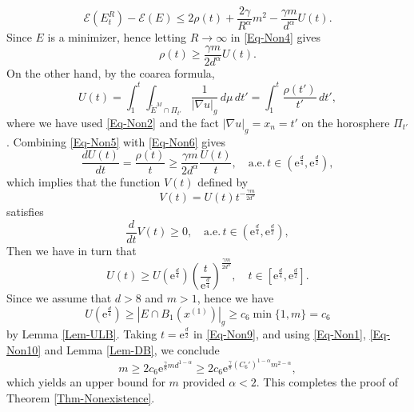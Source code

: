 \documentclass[11pt,reqno]{amsart}
\theoremstyle{definition}
\theoremstyle{remark}
\numberwithin{equation}{section}
\renewcommand{\(}{\left(}
\renewcommand{\)}{\right)}
\renewcommand{\-}{\overline}
\begin{document}
\begin{equation}\label{Eq-Non4}
	\mathcal{E}(E_t^R)-\mathcal{E}(E)\leq 2\rho(t)+\frac{2\gamma}{R^{\alpha}}m^2-\frac{\gamma m}{d^{\alpha}}U(t).
\end{equation}
Since $E$ is a minimizer, hence letting $R\to\infty$ in \eqref{Eq-Non4} gives
\begin{equation}\label{Eq-Non5}
	\rho(t)\geq \frac{\gamma m}{2d^{\alpha}}U(t).
\end{equation}
On the other hand, by the coarea formula, 
\begin{equation}\label{Eq-Non6}
	U(t)=\int_{1}^t\int_{\mathring{E}^M\cap\Pi_{t'}}\frac{1}{|\nabla u|_g}\,d\mu\,dt'=\int_{1}^t\frac{\rho(t')}{t'}\,dt',
\end{equation}
where we have used \eqref{Eq-Non2} and the fact $|\nabla u|_g=x_n=t'$ on the horosphere $\Pi_{t'}$. 
Combining \eqref{Eq-Non5} with \eqref{Eq-Non6} gives
\begin{equation}\label{Eq-Non7}
	\frac{d U(t)}{dt}=\frac{\rho(t)}{t}\geq \frac{\gamma m}{2d^{\alpha}}\frac{U(t)}{t},\quad\text{a.e.} \, t\in(\mathrm{e}^{\frac{d}{4}},\mathrm{e}^{\frac{d}{2}}),
\end{equation} 
which implies that the function $V(t)$ defined  by
\begin{equation*}
	V(t)=U(t)t^{-\frac{\gamma m}{2d^{\alpha}}} 
\end{equation*}
satisfies
\begin{equation}\label{Eq-Non8}
	\frac{d}{dt}V(t)\geq 0, \quad\text{a.e.} \, t\in(\mathrm{e}^{\frac{d}{4}},\mathrm{e}^{\frac{d}{2}}),
\end{equation}
Then we have in turn that 
\begin{equation}\label{Eq-Non9}
	U(t)\geq U(\mathrm{e}^{\frac{d}{4}})\left(\frac{t}{\mathrm{e}^{\frac{d}{4}}}\right)^{\frac{\gamma m}{2d^{\alpha}}}, \quad t\in[\mathrm{e}^{\frac{d}{4}},\mathrm{e}^{\frac{d}{2}}].
\end{equation}
Since we assume that $d>8$ and $m>1$, hence we have
\begin{equation}\label{Eq-Non10}
  U(\mathrm{e}^{\frac{d}{4}})\geq 	|E\cap B_1(x^{(1)})|_g\geq c_6\min\{1,m\}=c_6
\end{equation}
by Lemma \ref{Lem-ULB}. Taking $t=\mathrm{e}^{\frac{d}{2}}$ in \eqref{Eq-Non9}, and using \eqref{Eq-Non1}, \eqref{Eq-Non10} and Lemma \ref{Lem-DB}, we conclude
\begin{equation}
	m\geq 2c_6\mathrm{e}^{\frac{\gamma}{8}md^{1-\alpha}}\geq 2c_6\mathrm{e}^{\frac{\gamma}{8}{(C_6')}^{1-\alpha}m^{2-\alpha}},
\end{equation}
which yields an upper bound for $m$ provided $\alpha<2$. This completes the proof of Theorem \ref{Thm-Nonexistence}.
\end{document}
